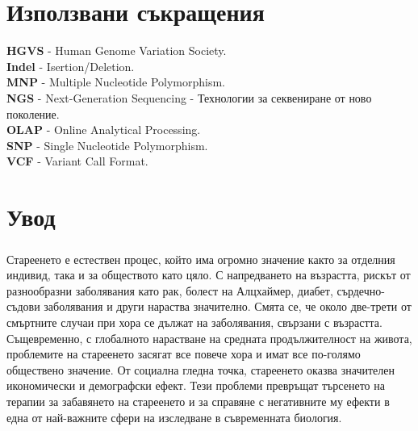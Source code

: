\documentclass[pdftex,cyrillic,14pt,a4page,twoside,openright]{extreport}
\newcommand\blankpage{%
    \null
    \thispagestyle{empty}%
    \newpage}
\begin{document}
\afterpage{\blankpage}


\tableofcontents
\pagebreak

\setlength\parindent{0pt}

\chapter*{Използвани съкращения}
\textbf{HGVS} - Human Genome Variation Society.\\
\textbf{Indel} - Isertion/Deletion.\\
\textbf{MNP} - Multiple Nucleotide Polymorphism.\\
\textbf{NGS} -  Next-Generation Sequencing - Технологии за секвениране от ново поколение.\\
\textbf{OLAP} - Online Analytical Processing.\\
\textbf{SNP} - Single Nucleotide Polymorphism.\\
\textbf{VCF} - Variant Call Format.\\

\chapter{Увод}
\paragraph{}

Стареенето е естествен процес, който има огромно значение както за отделния индивид, така и за обществото като цяло. С напредването на възрастта, рискът от разнообразни заболявания като рак, болест на Алцхаймер, диабет, сърдечно-съдови заболявания и други нараства значително. Смята се, че около две-трети от смъртните случаи при хора се дължат на заболявания, свързани с възрастта. Същевременно, с глобалното нарастване на средната продължителност на живота, проблемите на стареенето засягат все повече хора и имат все по-голямо обществено значение. От социална гледна точка, стареенето оказва значителен икономически и демографски ефект. Тези проблеми превръщат търсенето на терапии за забавянето на стареенето и за справяне с негативните му ефекти в една от най-важните сфери на изследване в съвременната биология.
\end{document}
